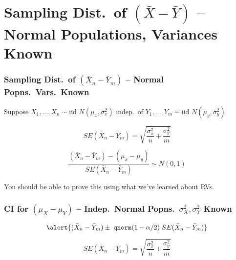 \section{Sampling Dist.\ of $(\bar{X} - \bar{Y})$ -- Normal Populations, Variances Known}
\begin{frame}
\frametitle{Sampling Dist.\ of $(\bar{X}_n - \bar{Y}_m)$ -- Normal Popns.\ Vars.\ Known}

\small

Suppose $X_1, \hdots, X_{n} \sim \mbox{iid } N(\mu_x, \sigma^2_x)$ indep.\ of $Y_1, \hdots, Y_{m} \sim \mbox{iid } N(\mu_y, \sigma^2_y)$

\[SE(\bar{X}_n - \bar{Y}_m) = \sqrt{\displaystyle\frac{\sigma_x^2}{n} + \frac{\sigma_y^2}{m}}\]

\[\frac{\left(\bar{X}_n - \bar{Y}_m\right) - (\mu_x - \mu_y)}{SE(\bar{X}_n - \bar{Y}_m) } \sim N(0,1)\]

\vspace{1em}

\alert{You should be able to prove this using what we've learned about RVs.}



\end{frame}
\begin{frame}
  \frametitle{CI for $(\mu_X - \mu_Y)$ -- Indep.\ Normal Popns.\, $\sigma_X^2, \sigma_Y^2$ Known}

	$$\alert{(\bar{X}_n - \bar{Y}_m) \pm \; \texttt{qnorm}(1-\alpha/2) \; SE(\bar{X}_n - \bar{Y}_m)}$$

  $$SE(\bar{X}_n - \bar{Y}_m) = \sqrt{\displaystyle\frac{\sigma_x^2}{n} + \frac{\sigma_y^2}{m} }$$
\end{frame}
%
%
%
%
%
